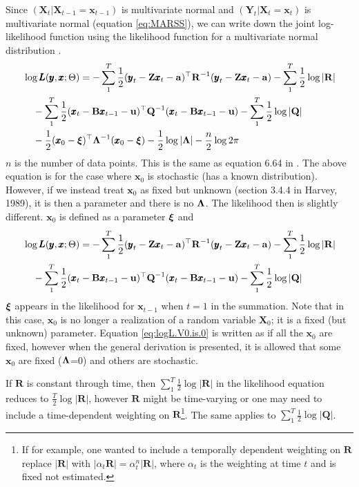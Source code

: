 \documentclass[]{article}
\def\xixi{\mbox{\boldmath $\xi$}}
\def\LAM{\mbox{\boldmath $\Lambda$}}
\def\ZZ{\mbox{$\mathbf Z$}}	\def\zz{\mbox{$\mathbf z$}}
\def\BB{\mbox{$\mathbf B$}}	\def\bb{\mbox{$\mathbf b$}}
\def\QQ{\mbox{$\mathbf Q$}}	 \def\qq{\mbox{$\mathbf q$}}
\def\RR{\mbox{$\mathbf R$}}	 \def\rr{\mbox{$\mathbf r$}}
\def\XX{\mbox{$\pmb{X}$}}	\def\xx{\mbox{$\pmb{x}$}}
\def\YY{\mbox{$\pmb{Y}$}}	\def\yy{\mbox{$\pmb{y}$}}
\def\LL{\mbox{$\pmb{L}$}}	\def\ll{\mbox{$\pmb{l}$}}
\begin{document}
Since $(\XX_t|\XX_{t-1}=\xx_{t-1})$ is multivariate normal and $(\YY_t|\XX_t=\xx_t)$ is multivariate normal (equation \ref{eq:MARSS}), we can write down the joint log-likelihood function using the likelihood function for a multivariate normal distribution \citep[section 4.3]{JohnsonWichern2007}.  
\begin{equation}\label{eq:logL}
\begin{split}
&\log\LL(\yy,\xx ; \Theta) = -\sum_1^T \frac{1}{2}(\yy_t - \ZZ \xx_t - \aa)^\top \RR^{-1} (\yy_t - \ZZ \xx_t - \aa) -\sum_1^T\frac{1}{2} \log |\RR|\\
&\quad  -\sum_1^T \frac{1}{2} (\xx_t - \BB \xx_{t-1} - \uu)^\top \QQ^{-1} (\xx_t - \BB \xx_{t-1} - \uu) - \sum_1^T\frac{1}{2}\log |\QQ|\\
&\quad  -\frac{1}{2}(\xx_0 - \xixi)^\top \LAM^{-1}(\xx_0 - \xixi) - \frac{1}{2}\log |\LAM| -   \frac{n}{2}\log 2\pi 
\end{split}
\end{equation}
$n$ is the number of data points. This is the same as equation 6.64 in \citet{ShumwayStoffer2006}. The above equation is for the case where $\xx_0$ is stochastic (has a known distribution).  However, if we instead treat $\xx_0$ as fixed but unknown (section 3.4.4 in Harvey, 1989), it is then a parameter and there is no $\LAM$.  The likelihood then is slightly different.  $\xx_0$ is defined as a parameter $\xixi$ and
\begin{equation}\label{eq:logL.V0.is.0}
\begin{split}
&\log\LL(\yy,\xx ; \Theta) = -\sum_1^T \frac{1}{2}(\yy_t - \ZZ \xx_t - \aa)^\top \RR^{-1} (\yy_t - \ZZ \xx_t - \aa) -\sum_1^T\frac{1}{2} \log |\RR|\\
&\quad  -\sum_1^T \frac{1}{2} (\xx_t - \BB \xx_{t-1} - \uu)^\top \QQ^{-1} (\xx_t - \BB \xx_{t-1} - \uu) - \sum_1^T\frac{1}{2}\log |\QQ|
\end{split}
\end{equation}
$\xixi$ appears in the likelihood for $\xx_{t-1}$ when $t=1$ in the summation. Note that in this case, $\xx_0$ is no longer a realization of a random variable $\XX_0$; it is a fixed (but unknown) parameter.  Equation \ref{eq:logL.V0.is.0} is written as if all the $\xx_0$ are fixed, however when the general derivation is presented, it is allowed that some $\xx_0$ are fixed ($\LAM$=0) and others are stochastic.

If $\RR$ is constant through time, then $\sum_1^T\frac{1}{2} \log |\RR|$ in the likelihood equation reduces to $\frac{T}{2}\log |\RR|$, however $\RR$ might be time-varying or one may need to include a time-dependent weighting on $\RR$\footnote{If for example, one wanted to include a temporally dependent weighting on $\RR$ replace $|\RR|$ with $|\alpha_t\RR|=\alpha_t^n|\RR|$, where $\alpha_t$ is the weighting at time $t$ and is fixed not estimated.}.  The same applies to $\sum_1^T\frac{1}{2}\log |\QQ|$.
\end{document}

